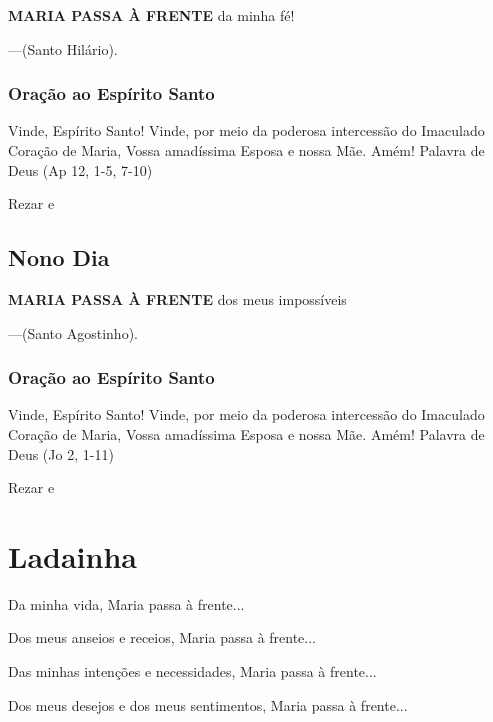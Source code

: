 \documentclass[a4paper,14pt]{extarticle} \usepackage[utf8]{inputenc}
\begin{document}
\noindent

\textbf{MARIA PASSA À FRENTE} da minha fé!


---(Santo Hilário).

\subsubsection*{Oração ao Espírito Santo}
Vinde, Espírito Santo! Vinde, por meio da poderosa intercessão do
Imaculado Coração de Maria, Vossa amadíssima Esposa e nossa Mãe.
Amém!
Palavra de Deus (Ap 12, 1-5, 7-10)

Rezar \textbf{} e \textbf{}


\subsection{Nono Dia}

\noindent

\textbf{MARIA PASSA À FRENTE} dos meus impossíveis


---(Santo Agostinho).

\subsubsection*{Oração ao Espírito Santo}
Vinde, Espírito Santo! Vinde, por meio da poderosa intercessão do
Imaculado Coração de Maria, Vossa amadíssima Esposa e nossa Mãe.
Amém!
Palavra de Deus (Jo 2, 1-11)

Rezar \textbf{} e \textbf{}


\newpage
\section{Ladainha} \label{ladainha}

Da minha vida, Maria passa à frente...

Dos meus anseios e receios, Maria passa à frente...

Das minhas intenções e necessidades, Maria passa à frente...

Dos meus desejos e dos meus sentimentos, Maria passa à frente...
\end{document}
